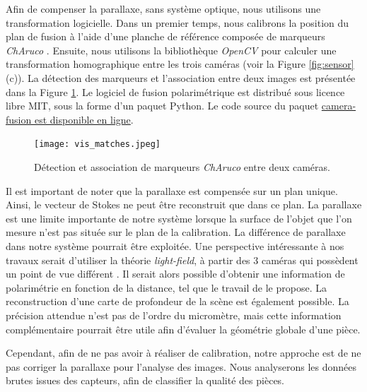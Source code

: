Afin de compenser la parallaxe, sans système optique, nous utilisons une transformation logicielle.
Dans un premier temps, nous calibrons la position du plan de fusion à l'aide d'une planche de référence composée de marqueurs \textit{ChAruco} \cite{garrido-jurado_automatic_2014, garrido-jurado_generation_2016, romero-ramirez_speeded_2018}.
Ensuite, nous utilisons la bibliothèque \textit{OpenCV} \cite{opencv_library} pour calculer une transformation homographique entre les trois caméras (voir la Figure \ref{fig:sensor} (c)).
La détection des marqueurs et l'association entre deux images est présentée dans la Figure \ref{fig:mecaruco}.
Le logiciel de fusion polarimétrique est distribué sous licence libre MIT, sous la forme d'un paquet Python.
Le code source du paquet \href{https://github.com/a1rb4Ck/camera-fusion}{camera-fusion est disponible en ligne}.

\begin{figure}[thb]
	\centering
	\texttt{[image: vis\_matches.jpeg]}
	\caption{Détection et association de marqueurs \textit{ChAruco} entre deux caméras.}
	\label{fig:mecaruco}
\end{figure}

Il est important de noter que la parallaxe est compensée sur un plan unique.
Ainsi, le vecteur de Stokes ne peut être reconstruit que dans ce plan.
La parallaxe est une limite importante de notre système lorsque la surface de l'objet que l'on mesure n'est pas située sur le plan de la calibration.
La différence de parallaxe dans notre système pourrait être exploitée.
Une perspective intéressante à nos travaux serait d'utiliser la théorie \textit{light-field}, à partir des 3 caméras qui possèdent un point de vue différent \cite{wilburn_high_2005}.
Il serait alors possible d'obtenir une information de polarimétrie en fonction de la distance, tel que le travail de \citeauthor{gendre_interest_2018} \cite{gendre_interest_2018} le propose.
La reconstruction d'une carte de profondeur de la scène est également possible.
La précision attendue n'est pas de l'ordre du micromètre, mais cette information complémentaire pourrait être utile afin d'évaluer la géométrie globale d'une pièce.

Cependant, afin de ne pas avoir à réaliser de calibration, notre approche est de ne pas corriger la parallaxe pour l'analyse des images. 
Nous analyserons les données brutes issues des capteurs, afin de classifier la qualité des pièces.

